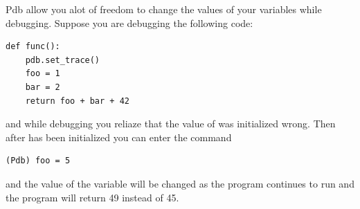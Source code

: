 \begin{info}
Pdb allow you alot of freedom to change the values of your variables while debugging. Suppose you are debugging the following code:
\begin{lstlisting}
def func():
    pdb.set_trace()
    foo = 1
    bar = 2
    return foo + bar + 42
\end{lstlisting}
and while debugging you reliaze that the value of  was initialized wrong. Then after  has been initialized you can enter the command
\begin{lstlisting}
(Pdb) foo = 5
\end{lstlisting}
and the value of the variable will be changed as the program continues to run and the program will return 49 instead of 45.
\end{info}




